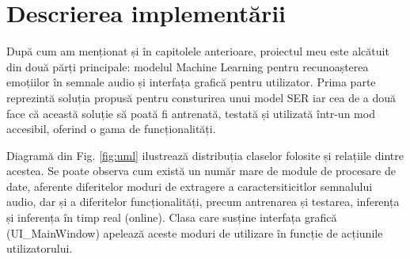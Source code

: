 \documentclass[a4paper,12pt]{book}
\begin{document}
		\chapter{Descrierea implementării}
				După cum am menționat și în capitolele anterioare, proiectul meu este alcătuit din două părți principale: modelul Machine Learning pentru recunoașterea emoțiilor în semnale audio și interfața grafică pentru utilizator. Prima parte reprezintă soluția propusă pentru consturirea unui model SER iar cea de a două face că această soluție să poată fi antrenată, testată și utilizată într-un mod accesibil, oferind o gama de funcționalități.\par 
				Diagramă din Fig. \ref{fig:uml} ilustrează distribuția claselor folosite și relațiile dintre acestea. Se poate observa cum există un număr mare de module de procesare de date, aferente diferitelor moduri de extragere a caractersiticitlor semnalului audio, dar și a diferitelor funcționalități, precum antrenarea și testarea, inferența și inferența în timp real (online). Clasa care susține interfața grafică (UI\_MainWindow) apelează aceste moduri de utilizare în funcție de acțiunile utilizatorului. \par
				
\end{document}
